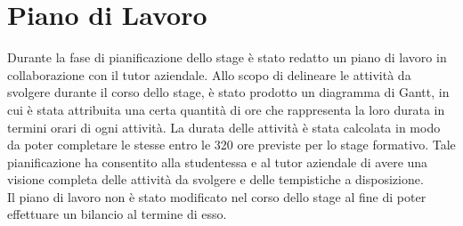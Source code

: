 \section{Piano di Lavoro}
Durante la fase di pianificazione dello stage è stato redatto un piano di lavoro in collaborazione con il tutor aziendale.
Allo scopo di delineare le attività da svolgere durante il corso dello stage, è stato prodotto un diagramma di Gantt, in cui è stata attribuita una certa quantità di ore che rappresenta la loro durata in termini orari di ogni attività. 
La durata delle attività è stata calcolata in modo da poter completare le stesse entro le 320 ore previste per lo stage formativo.
Tale pianificazione ha consentito alla studentessa e al tutor aziendale di avere una visione completa delle attività da svolgere e delle tempistiche a disposizione. \\
Il piano di lavoro non è stato modificato nel corso dello stage al fine di poter effettuare un bilancio al termine di esso.
